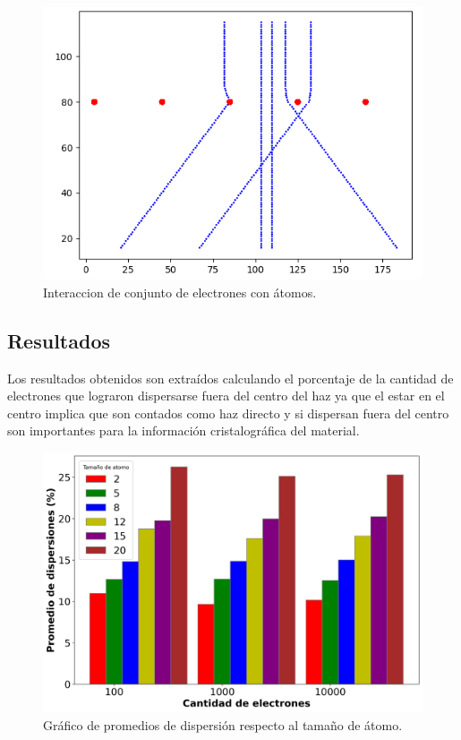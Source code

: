 \documentclass[3pt,twocolumn]{elsarticle}
\begin{document}
\begin{figure}[h!]
    \centering
    \includegraphics[scale=.4]{5electrones.png}
    \caption{Interaccion de conjunto de electrones con átomos.}
    \label{5electrones}
\end{figure}
\newpage
\subsection{Resultados}
Los resultados obtenidos son extraídos calculando el porcentaje de la cantidad de electrones que lograron dispersarse fuera del centro del haz ya que el estar en el centro implica que son contados como haz directo y si dispersan fuera del centro son importantes para la información cristalográfica del material.

\begin{figure}[h!]
    \centering
    \includegraphics[scale=0.33]{bar_plot.png}
    \caption{Gráfico de promedios de dispersión respecto al tamaño de átomo.}
    \label{barras}
\end{figure}
\end{document}
